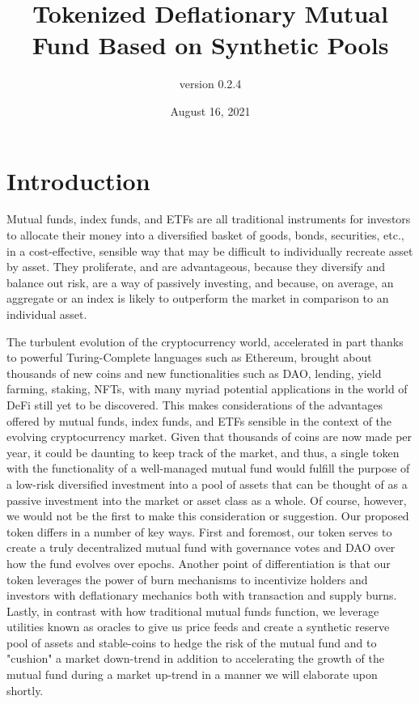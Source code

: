 \documentclass[12pt]{article}
\title{Tokenized Deflationary Mutual Fund Based on Synthetic Pools}
\author{version 0.2.4}
\date{August 16, 2021}
\begin{document}
\maketitle


\section{Introduction}
    
   \indent
   Mutual funds, index funds, and ETFs are all traditional instruments for investors to allocate their money into a diversified basket of goods, bonds, securities, etc., in a cost-effective, sensible way that may be difficult to individually recreate asset by asset. They proliferate, and are advantageous, because they diversify and balance out risk, are a way of passively investing, and because, on average, an aggregate or an index is likely to outperform the market in comparison to an individual asset. \par
   
   \vspace{.15cm}
   
   The turbulent evolution of the cryptocurrency world, accelerated in part thanks to powerful Turing-Complete languages such as Ethereum, brought about thousands of new coins and new functionalities such as DAO, lending, yield farming, staking, NFTs, with many myriad potential applications in the world of DeFi still yet to be discovered. This makes considerations of the advantages offered by mutual funds, index funds, and ETFs sensible in the context of the evolving cryptocurrency market. Given that thousands of coins are now made per year, it could be daunting to keep track of the market, and thus, a single token with the functionality of a well-managed mutual fund would fulfill the purpose of a low-risk diversified investment into a pool of assets that can be thought of as a passive investment into the market or asset class as a whole. Of course, however, we would not be the first to make this consideration or suggestion. Our proposed token differs in a number of key ways. First and foremost, our token serves to create a truly decentralized mutual fund with governance votes and DAO over how the fund evolves over epochs. Another point of differentiation is that our token leverages the power of burn mechanisms to incentivize holders and investors with deflationary mechanics both with transaction and supply burns. Lastly, in contrast with how traditional mutual funds function, we leverage utilities known as oracles to give us price feeds and create a synthetic reserve pool of assets and stable-coins to hedge the risk of the mutual fund and to "cushion" a market down-trend in addition to accelerating the growth of the mutual fund during a market up-trend in a manner we will elaborate upon shortly.  \par
   
\end{document}
